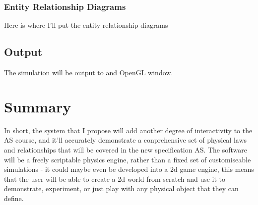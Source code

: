 \subsubsection{Entity Relationship Diagrams}
	Here is where I'll put the entity relationship diagrams
\subsection{Output}
	The simulation will be output to and OpenGL window.




\section{Summary}
In short, the system that I propose will add another degree of interactivity to the AS course, and it'll accurately demonstrate a conprehensive set of physical laws and relationships that will be covered in the new specification AS. The software will be a freely scriptable physics engine, rather than a fixed set of customiseable simulations - it could maybe even be developed into a 2d game engine, this means that the user will be able to create a 2d world from scratch and use it to demonstrate, experiment, or just play with any physical object that they can define.